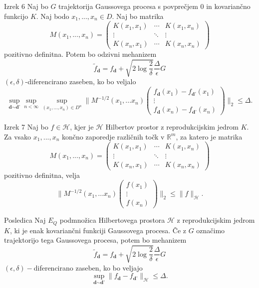 \documentclass{beamer}
\begin{document}
\begin{frame}
\begin{block}{Izrek 6}
Naj bo $G$ trajektorija Gaussovega procesa s povprečjem 0 in kovariančno funkcijo $K$. Naj bodo $x_1,...,x_n \in D$. Naj bo matrika
$$
M(x_1,...,x_n) = 
 \begin{pmatrix}
  K(x_1,x_1) & \cdots & K(x_1,x_n) \\
  \vdots    & \ddots & \vdots  \\
  K(x_n,x_1) & \cdots & K(x_n,x_n) 
 \end{pmatrix}
$$
pozitivno definitna. Potem bo odzivni mehanizem 
$$
\widetilde{f}_{\textbf{d}} = f_{\textbf{d}} + \sqrt{2\log{\frac{2}{\delta}}} \frac{\Delta}{\epsilon}G
$$
$(\epsilon, \delta)$-diferencirano zaseben, ko bo veljalo
\begin{equation}\label{meja*}
\sup_{\textbf{d} \sim \textbf{d'}} \sup_{n < \infty} \sup_{(x_1,...,x_n) \in D^n} 
\bigg\|M^{-1/2}(x_1,...x_n)
\begin{pmatrix}
  f_{\textbf{d}}(x_1)-f_{\textbf{d'}}(x_1)  \\
  \vdots     \\
  f_{\textbf{d}}(x_n)-f_{\textbf{d'}}(x_n)
 \end{pmatrix}
\bigg\|_2 \leq \Delta. 
\end{equation}
\end{block}
\end{frame}

\begin{frame}
\begin{block}{Izrek 7}
Naj bo $f \in \mathcal{H}$, kjer je $\mathcal{H}$ Hilbertov prostor z reprodukcijskim jedrom $K$. Za vsako $x_1, ..., x_n$ končno zaporedje različnih točk v $\mathbb{R}^m$, za katero je matrika
$$
M(x_1,...,x_n) = 
 \begin{pmatrix}
  K(x_1,x_1) & \cdots & K(x_1,x_n) \\
  \vdots    & \ddots & \vdots  \\
  K(x_n,x_1) & \cdots & K(x_n,x_n) 
 \end{pmatrix}
$$
pozitivno definitna, velja
$$
\bigg\|M^{-1/2}(x_1,...x_n)
\begin{pmatrix}
  f(x_1)  \\
  \vdots     \\
  f(x_n)
 \end{pmatrix}
\bigg\|_2 \leq \|f\|_{\mathcal{H}}.
$$
\end{block}
\end{frame}

\begin{frame}
\begin{block}{Posledica}
Naj $E_Q$  podmnožica Hilbertovega prostora $\mathcal{H}$ z reprodukcijskim jedrom $K$, ki je enak kovariančni funkciji Gaussovega procesa. Če z $G$ označimo trajektorijo tega Gaussovega procesa, potem bo mehanizem 
$$
\widetilde{f}_{\textbf{d}} = f_{\textbf{d}} + \sqrt{2\log{\frac{2}{\delta}}} \frac{\Delta}{\epsilon}G
$$
$(\epsilon,\delta)-$diferencirano zaseben, ko bo veljajo 
$$
\sup_{\textbf{d} \sim \textbf{d'}} \| f_{\textbf{d}} -  f_{\textbf{d'}} \|_{\mathcal{H}} \leq \Delta.
$$
\end{block}
\end{frame}
\end{document}
